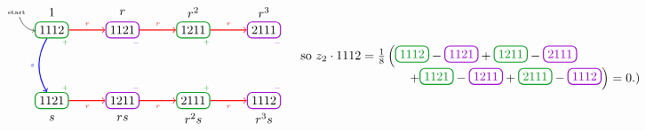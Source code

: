\documentclass[11pt, reqno]{amsart}
\theoremstyle{plain}
\theoremstyle{definition}
\theoremstyle{example}
\newcommand\TikZ[1]{\begin{matrix}\begin{tikzpicture}#1\end{tikzpicture}\end{matrix}}
\newcommand{\gV}[1]{\TikZ{\node[thick, dgreen, rounded corners, draw] at (0,0){#1};}}
\newcommand{\pV}[1]{\TikZ{\node[thick, purple, rounded corners, draw] at (0,0){#1};}}
\begin{document}
\centerline{$\TikZ{
	\node[thick, dgreen, rounded corners, draw, label={below right, inner sep=1pt, dgreen}:{\tiny$+$}] 
			(1112) at (0,0) {\color{black}1112}; 
	\node[thick, purple, rounded corners, draw, label={below right, inner sep=1pt, purple}:{\tiny$-$}]
			(1121) at (2,0) {\color{black}1121}; 
	\node[thick, dgreen, rounded corners, draw, label={below right, inner sep=1pt, dgreen}:{\tiny$+$}]
			(1211) at (4,0) {\color{black}1211}; 
	\node[thick, purple, rounded corners, draw, label={below right, inner sep=1pt, purple}:{\tiny$-$}]
			(2111) at (6,0) {\color{black}2111};  
	\node[thick, dgreen, rounded corners, draw, label={above right, inner sep=1pt, dgreen}:{\tiny$+$}]
			(1121b) at (0,-2) {\color{black}1121}; 
	\node[thick, purple, rounded corners, draw, label={above right, inner sep=1pt, purple}:{\tiny$-$}]
			(1211b) at (2,-2) {\color{black}1211}; 
	\node[thick, dgreen, rounded corners, draw, label={above right, inner sep=1pt, dgreen}:{\tiny$+$}]
			(2111b) at (4,-2) {\color{black}2111}; 
	\node[thick, purple, rounded corners, draw, label={above right, inner sep=1pt, purple}:{\tiny$-$}]
			(1112b) at (6,-2) {\color{black}1112};
	\node[black] (1) at (0,.5) {$1$}; 
	\node[black] (r) at (2,.5) {$r$}; 
	\node[black] (rr) at (4,.5) {$r^2$}; 
	\node[black] (rrr) at (6,.5) {$r^3$};  
	\node[black] (s) at (0,-2.5) {$s$}; 
	\node[black] (rs) at (2,-2.5) {$rs$}; 
	\node[black] (rrs) at (4,-2.5) {$r^2s$}; 
	\node[black] (rrrs) at (6,-2.5) {$r^3s$};
	\draw[thick, red, ->] (1112) to node[above]{\tiny$r$} (1121);
	\draw[thick, red, ->] (1121) to node[above]{\tiny$r$} (1211);
	\draw[thick, red, ->] (1211) to node[above]{\tiny$r$} (2111);
	\draw[thick, blue, ->, bend right] (1112) to node[left]{\tiny$s$} (1121b);
	\draw[thick, red, ->] (1121b) to node[below]{\tiny$r$} (1211b);
	\draw[thick, red, ->] (1211b) to node[below]{\tiny$r$} (2111b);
	\draw[thick, red, ->] (2111b) to node[below]{\tiny$r$} (1112b);
	\node[inner sep = 2pt] (s) at (-1,.5) {\tiny start}; \draw [->, bend right] (s) to (1112);
} \quad\begin{array}{l} \text{so } z_2 \cdot 1112 = \frac{1}{8}\left(\gV{1112} - \pV{1121}+\gV{1211}-\pV{2111}\right.\\\hspace{1.2in}\left.+\gV{1121}-\pV{1211}+\gV{2111}-\pV{1112}\right) = 0.)\end{array}$}
\end{document}
